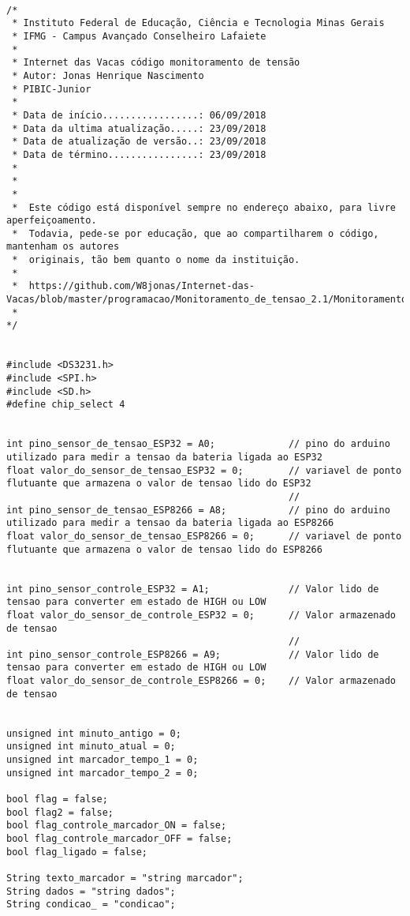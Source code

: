 \begin{lstlisting}

/*
 * Instituto Federal de Educação, Ciência e Tecnologia Minas Gerais
 * IFMG - Campus Avançado Conselheiro Lafaiete 
 * 
 * Internet das Vacas código monitoramento de tensão
 * Autor: Jonas Henrique Nascimento
 * PIBIC-Junior
 * 
 * Data de início.................: 06/09/2018
 * Data da ultima atualização.....: 23/09/2018
 * Data de atualização de versão..: 23/09/2018
 * Data de término................: 23/09/2018
 * 
 * 
 * 
 *  Este código está disponível sempre no endereço abaixo, para livre aperfeiçoamento. 
 *  Todavia, pede-se por educação, que ao compartilharem o código, mantenham os autores
 *  originais, tão bem quanto o nome da instituição.
 *  
 *  https://github.com/W8jonas/Internet-das-Vacas/blob/master/programacao/Monitoramento_de_tensao_2.1/Monitoramento_de_tensao_2.1.ino
 *  
*/


#include <DS3231.h>
#include <SPI.h>
#include <SD.h>
#define chip_select 4


int pino_sensor_de_tensao_ESP32 = A0;             // pino do arduino utilizado para medir a tensao da bateria ligada ao ESP32
float valor_do_sensor_de_tensao_ESP32 = 0;        // variavel de ponto flutuante que armazena o valor de tensao lido do ESP32
                                                  //
int pino_sensor_de_tensao_ESP8266 = A8;           // pino do arduino utilizado para medir a tensao da bateria ligada ao ESP8266
float valor_do_sensor_de_tensao_ESP8266 = 0;      // variavel de ponto flutuante que armazena o valor de tensao lido do ESP8266


int pino_sensor_controle_ESP32 = A1;              // Valor lido de tensao para converter em estado de HIGH ou LOW
float valor_do_sensor_de_controle_ESP32 = 0;      // Valor armazenado de tensao
                                                  //
int pino_sensor_controle_ESP8266 = A9;            // Valor lido de tensao para converter em estado de HIGH ou LOW
float valor_do_sensor_de_controle_ESP8266 = 0;    // Valor armazenado de tensao


unsigned int minuto_antigo = 0;
unsigned int minuto_atual = 0;
unsigned int marcador_tempo_1 = 0;
unsigned int marcador_tempo_2 = 0;

bool flag = false;
bool flag2 = false;
bool flag_controle_marcador_ON = false;
bool flag_controle_marcador_OFF = false;
bool flag_ligado = false;

String texto_marcador = "string marcador";
String dados = "string dados";
String condicao_ = "condicao";


\end{lstlisting}
